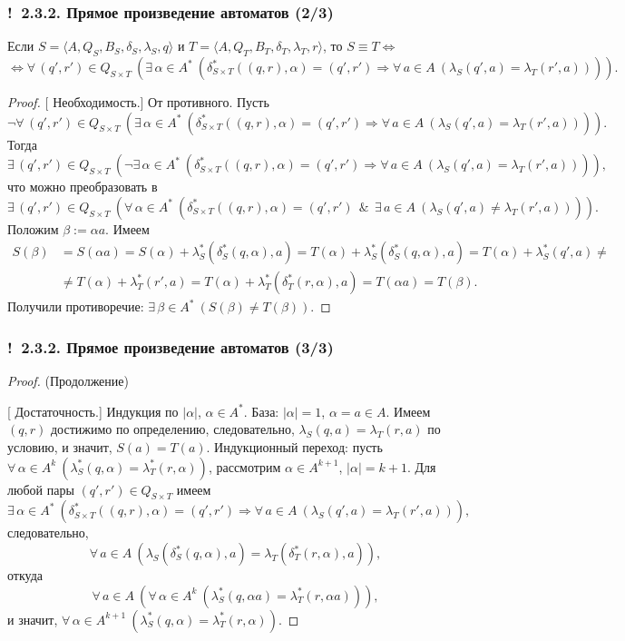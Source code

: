 \documentclass[mathserif,12pt,aspectratio=169]{beamer}
\let\Equiv\Longleftrightarrow
\def\Assign{\operatorname{:=}}
\def\A#1#2{\forall\,#1\ \left(#2\right)}
\def\E#1#2{\exists\,#1\ \left(#2\right)}
\let\Impl\Longrightarrow
\def\And{\operatorname{\,\&\,}}
\def\Not{\neg}
\def\proofsection#1{\par{\color{brown}\sffamily\small  [\;}{\sffamily\small\color{brown} #1}{\sffamily\small\color{brown}\;]}\;}
\def\Ok{{\color{green}\textbf{!}\ }}
\begin{document}
\begin{frame}
\frametitle{\Ok 2.3.2. Прямое произведение автоматов (2/3)}
\begin{remark} Если
$S=\langle A, Q_S, B_S,
\delta_S, \lambda_S, q\rangle$ и $T=\langle A, Q_{T}, B_{T},
\delta_{T}, \lambda_{T}, r\rangle$,
то
$S\equiv T \Equiv$ \\$\Equiv\! \A{(q', r')\!\in\! Q_{S\!\times\! T}}{\E{\alpha\!\in\! A^*}{
\delta^*_{S\!\times\! T}\left((q,r),\alpha\right)\! =\! (q',r')\! \Impl\!\A{a\!\in\! A}{\lambda_S(q', a)\!= \!\lambda_{T}(r',a)}}}.
$

\end{remark}
\begin{proof}
\proofsection{Необходимость.}
От противного. Пусть
$$
\neg\A{(q', r')\!\in\! Q_{S\!\times\! T}}{\E{\alpha\!\in\! A^*}{
\delta^*_{S\!\times\! T}\left((q,r),\alpha\right)\! =\! (q',r')\! \Impl\!\A{a\!\in\! A}{\lambda_S(q', a)\!= \!\lambda_{T}(r',a)}}}.
$$
Тогда
$$
\E{(q', r')\!\in\! Q_{S\!\times\! T}}{\Not\E{\alpha\!\in\! A^*}{
\delta^*_{S\!\times\! T}\left((q,r),\alpha\right)\! =\! (q',r')\! \Impl\!\A{a\!\in\! A}{\lambda_S(q', a)\!= \!\lambda_{T}(r',a)}}},
$$
что можно преобразовать в
$$
\E{(q', r')\!\in\! Q_{S\!\times\! T}}{\A{\alpha\!\in\! A^*}{
\delta^*_{S\!\times\! T}\left((q,r),\alpha\right)\! =\! (q',r')\! \And\!\E{a\!\in\! A}{\lambda_S(q', a)\!\neq \!\lambda_{T}(r',a)}}}.
$$
Положим $\beta\Assign\alpha a$. Имеем
\begin{align*}
S(\beta)&=S(\alpha a)= S(\alpha)+\lambda_S^*(\delta_S^*(q,\alpha),a)= 
T(\alpha)+\lambda_S^*(\delta_S^*(q,\alpha),a) =T(\alpha)+\lambda_S^*(q',a)\neq \\
&\neq T(\alpha)+\lambda^*_{T}(r',a)= 
T(\alpha)+\lambda_{T}^*(\delta^*_{T}(r,\alpha), a) = T(\alpha a)=T(\beta).
\end{align*}
Получили противоречие: $\E {\beta\in A^*}{S(\beta)\neq T(\beta)}$.
\end{proof}
\end{frame}


\begin{frame}
\frametitle{\Ok 2.3.2. Прямое произведение автоматов (3/3)}
\begin{proof} (Продолжение)
\proofsection{Достаточность.} Индукция по $|\alpha|$, $\alpha \in
A^*$. База: $|\alpha|=1$, $\alpha = a \in A$. Имеем $(q,r)$
достижимо по определению, следовательно, $\lambda_S(q,a)=
\lambda_{T}(r,a)$ по условию, и значит, $S(a) = T(a)$. Индукционный
переход: пусть $\A{\alpha\in A^k}{\lambda^*_S(q,\alpha)=
\lambda^*_{T}(r,\alpha)}$, 
рассмотрим $\alpha\in A^{k+1}$,
$|\alpha|=k+1$. Для любой пары $(q', r')\in 
Q_{S \times T}$ имеем
$$
\E{\alpha\in A^*}
{\delta^*_{S\times T} \left((q,r),\alpha\right)=(q',r')\Impl
\A{ a\in A }{\lambda_S(q',a)=\lambda_{T}(r',a)}},
$$
следовательно,
$$
\A{a\in A}{\lambda_S\left(\delta^*_S (q,\alpha), a\right) =
\lambda_{T}\left(\delta^*_{T}(r,\alpha), a\right)},
$$
откуда
$$
\A{a\in A}{\A{\alpha\in A^k }{\lambda^*_S (q,\alpha a) =
\lambda^*_{T}(r,\alpha a)}},
$$
и значит,
$
\A{\alpha\in A^{k+1}}{\lambda^*_S(q,\alpha) = \lambda^*_T(r,\alpha)}.$
\end{proof}

\end{frame}
\end{document}
